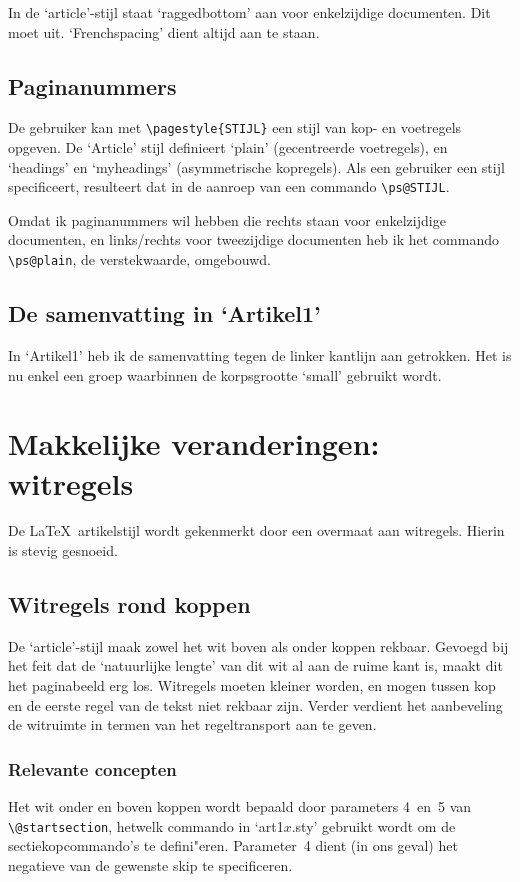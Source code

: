 \documentclass[a4paper]{artikel1} %
\begin{document}
In de `article'-stijl staat `raggedbottom' aan voor enkelzijdige
documenten. Dit moet uit. `Frenchspacing' dient altijd aan te staan.
 
\subsection{Paginanummers}
De gebruiker kan met \verb.\pagestyle{STIJL}. een stijl van kop- en
voetregels opgeven. De `Article' stijl definieert `plain'
(gecentreerde voetregels), en `headings' en `myheadings'
(asymmetrische kopregels).  Als een gebruiker een stijl specificeert,
resulteert dat in de aanroep van een commando \verb.\ps@STIJL..
 
Omdat ik paginanummers wil hebben die rechts staan voor enkelzijdige
documenten, en links/rechts voor tweezijdige documenten heb ik het
commando \verb.\ps@plain., de verstekwaarde, omgebouwd.
 
\subsection{De samenvatting in `Artikel1'}
In `Artikel1' heb ik de samenvatting tegen de linker kantlijn aan
getrokken. Het is nu enkel een groep waarbinnen de korpsgrootte
`small' gebruikt wordt.
 
\section{Makkelijke veranderingen: witregels}
 
De \LaTeX\ artikelstijl wordt gekenmerkt door een overmaat aan
witregels. Hierin is stevig gesnoeid.
 
\subsection{Witregels rond koppen}
 
De `article'-stijl maak zowel het wit boven als onder koppen rekbaar.
Gevoegd bij het feit dat de `natuurlijke lengte' van dit wit al aan de
ruime kant is, maakt dit het paginabeeld erg los. Witregels moeten
kleiner worden, en mogen tussen kop en de eerste regel van de tekst
niet rekbaar zijn.  Verder verdient het aanbeveling de witruimte in
termen van het regeltransport aan te geven.
 
\subsubsection{Relevante concepten}
Het wit onder en boven koppen wordt bepaald door parameters 4~en~5 van
\verb.\@start.\-\verb.section., hetwelk commando in `art1$x$.sty'
gebruikt wordt om de sectiekopcommando's te defini"eren. Parameter~4
dient (in ons geval) het negatieve van de gewenste skip te
specificeren.
 
\end{document}
